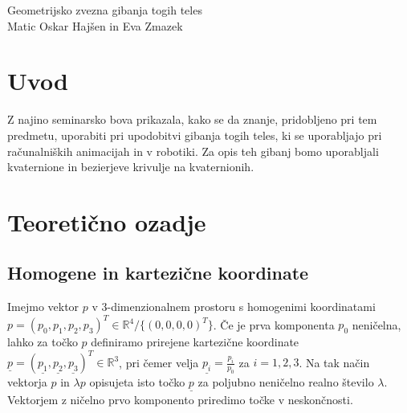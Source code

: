 \documentclass[12pt,a4paper,twoside]{article}
\theoremstyle{definition} %
\theoremstyle{plain} %
\numberwithin{equation}{section}  %
\newcommand{\R}{\mathbb R}
\begin{document}
\thispagestyle{empty} %



\begin{titlepage}\centering
{}
\vspace*{\fill}
{\LARGE Geometrijsko zvezna gibanja togih teles} \\[1cm]
\large Matic Oskar Hajšen  in  Eva Zmazek
\vspace*{\fill}
\vfill
{}
\end{titlepage}

\cleardoublepage

\tableofcontents

\lstlistoflistings

\newpage

\section{Uvod}

Z najino seminarsko bova prikazala, kako se da znanje, pridobljeno pri tem predmetu, uporabiti pri upodobitvi gibanja togih teles, ki se uporabljajo pri računalniških animacijah in v robotiki. Za opis teh gibanj bomo uporabljali kvaternione in bezierjeve krivulje na kvaternionih.

\section{Teoretično ozadje}

\subsection{Homogene in kartezične koordinate}

Imejmo vektor $p$ v $3$-dimenzionalnem prostoru s homogenimi koordinatami $p = (p_0,p_1,p_2,p_3)^T \in \R^4 / \{(0,0,0,0)^T\}$. Če je prva komponenta $p_0$ neničelna, lahko za točko $p$ definiramo prirejene kartezične koordinate $\underline{p} = (\underline{p_1}, \underline{p_2}, \underline{p_3})^T \in \R^3$, pri čemer velja $\underline{p_i} = \frac{p_i}{p_0}$ za $i=1,2,3$. Na tak način vektorja $p$ in $\lambda p$ opisujeta isto točko $\underline{p}$ za poljubno neničelno realno število $\lambda$. Vektorjem z ničelno prvo komponento priredimo točke v neskončnosti.
\end{document}

